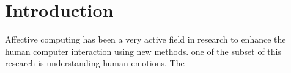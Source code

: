\section{Introduction}
Affective computing has been a very active field in research to enhance the human computer interaction using new methods. one of the subset of this research is understanding human emotions. The 
